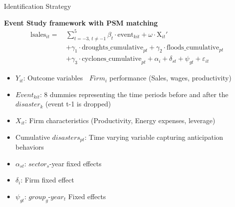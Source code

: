 \documentclass[
  xcolor=svgnames,
  bookmarks=true,
  bookmarksopen=true,
  pdfborder={0 0 0},
  pdfhighlight={/N},
  linkbordercolor={rgb}{0.5,0.5,0.5},
  implicit=false,
  colorlinks=true,
  allcolors=deepblue
]{beamer}
\begin{document}
\begin{frame}{Identification Strategy}

\textbf{Event Study framework with PSM matching}
\centering
\begin{align}
\text{lsales}_{it} =\ & \sum_{t = -3,\, t \ne -1}^{5} \beta_t \cdot \text{event}_{kit} + \omega \cdot \text{X}_{it}'\nonumber \\
&
+ \gamma_1 \cdot \text{droughts\_cumulative}_{pt}
+ \gamma_2 \cdot \text{floods\_cumulative}_{pt} \nonumber \\
& + \gamma_3 \cdot \text{cyclones\_cumulative}_{pt}
+ \alpha_i + \delta_{st} + \psi_{gt} + \varepsilon_{it}
\end{align}

\scriptsize
\begin{itemize}
    \item $Y_{it}$:  Outcome variables  $Firm_{i}$ performance (Sales, wages, productivity)
    \item $Event_{kit}$: 8 dummies representing the time periods before and after the $disaster_ {k}$ (event t-1 is dropped)
    \item $X_{it}$: Firm characteristics (Productivity, Energy expenses, leverage)
    \item Cumulative $disasters_{pt}$: Time varying variable capturing anticipation behaviors
    \item $\alpha_{st}$: $sector_{s}$-year fixed effects
    \item $\delta_{i}$: Firm fixed effect
    \item $\psi_{gt}$: $group_{g}$-$year_{t}$ Fixed effects

\end{itemize}

\end{frame}
\end{document}
